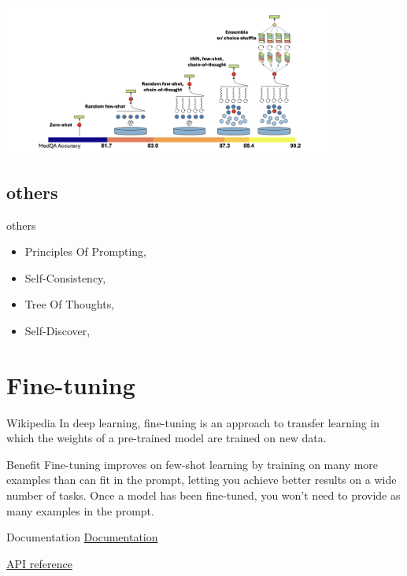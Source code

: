 \documentclass[11.5pt]{beamer}
\begin{document}
\begin{frame}
\includegraphics[width=11cm]{Figures/fig5.png}
\end{frame}


\subsection{others}
\begin{frame}{others}
\begin{itemize}
    \item Principles Of Prompting, \cite{Bsharat2024}
    \item Self-Consistency, \cite{Wang2022}
    \item Tree Of Thoughts, \cite{Yao2023}
    \item Self-Discover, \cite{Zhou2024}
\end{itemize}
\end{frame}



\section{Fine-tuning}
\begin{frame}{Wikipedia}
In deep learning, fine-tuning is an approach to transfer learning in which the
weights of a pre-trained model are trained on new data.
\end{frame}
\begin{frame}{Benefit}
Fine-tuning improves on few-shot learning by training on many more examples
than can fit in the prompt, letting you achieve better results on a wide number
of tasks.
Once a model has been fine-tuned, you won't need to provide as many examples
in the prompt.
\end{frame}

\begin{frame}{Documentation}
\href{https://platform.openai.com/docs/guides/fine-tuning}{Documentation}

\href{https://platform.openai.com/docs/api-reference/fine-tuning}{API reference}
\end{frame}
\end{document}
